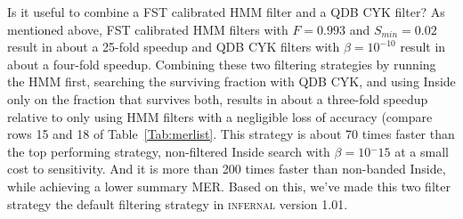 Is it useful to combine a FST calibrated HMM filter and a QDB CYK
filter?  As mentioned above, FST calibrated HMM filters with $F=0.993$
and $S_{min} = 0.02$ result in about a 25-fold speedup and QDB CYK
filters with $\beta=10^{-10}$ result in about a four-fold
speedup. Combining these two filtering strategies by running the HMM
first, searching the surviving fraction with QDB CYK, and using Inside
only on the fraction that survives both, results in about a three-fold
speedup relative to only using HMM filters with a negligible loss of
accuracy (compare rows 15 and 18 of Table~\ref{Tab:merlist}.  This
strategy is about 70 times faster than the top performing strategy,
non-filtered Inside search with $\beta=10{^-15}$ at a small cost to
sensitivity. And it is more than 200 times faster than non-banded
Inside, while achieving a lower summary MER. Based on this, we've made
this two filter strategy the default filtering strategy in
\textsc{infernal} version 1.01.

\begin{comment}
\begin{itemize}
\item 
Q1: Is FST accurate: is sensitivity near $F$? 
\item 
A1a: Yes, in that it gives better sensitivity that 0.01.
\item 
A1b: ? What fraction of TPs are missed overall, per family?

\item 
Q2: Do we gain sensitivity by trusting FST when it tells us NOT to
filter (or to filter permissively)?
\item 
A2: ? Look at families where filtering is turned off (or S > X=0.01),
is FST RMARK performance for these families much better than for
RaveNnA or S=0.01 families?

\item 
Q3: Do we gain speed by trusting FST when it tells us to filter more
strictly than S=0.01? Do we sacrifice sensitivity in these cases?

\item
A3: ? Look at families where filtering is strict (S < X=0.01),
is FST RMARK performance for these families much worse than for
RaveNnA or S=0.01 families? Are the run times faster?
\end{itemize}
\end{comment}
